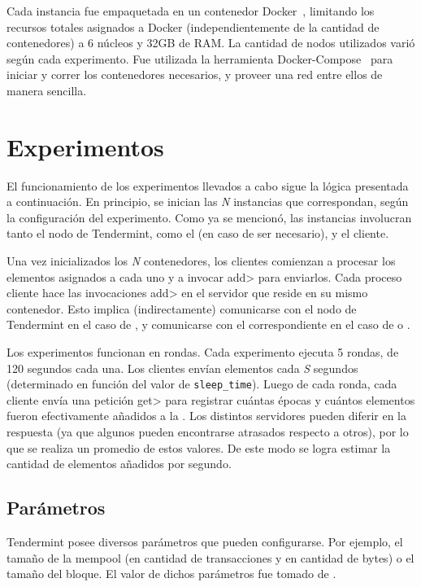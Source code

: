 %
Cada instancia fue empaquetada en un contenedor Docker~\cite{docker},
limitando los recursos totales asignados a Docker (independientemente de la cantidad de contenedores)
a 6 núcleos y 32GB de RAM.
%
La cantidad de nodos utilizados varió según cada experimento.
%
Fue utilizada la herramienta Docker-Compose~\cite{docker-compose} para iniciar y correr los contenedores necesarios,
y proveer una red entre ellos de manera sencilla.


\section{Experimentos}
El funcionamiento de los experimentos llevados a cabo sigue la lógica presentada a continuación.
%
En principio, se inician las \textit{N} instancias que correspondan, según la configuración del experimento.
%
Como ya se mencionó, las instancias involucran tanto el nodo de Tendermint, como el \collector (en caso de
ser necesario), y el cliente.
%

Una vez inicializados los \textit{N} contenedores, los clientes comienzan a procesar los elementos asignados a cada
uno y a invocar \<add> para enviarlos.
%
Cada proceso cliente hace las invocaciones \<add> en el servidor que reside en su mismo contenedor. 
%
Esto implica (indirectamente) comunicarse con el nodo de Tendermint en el caso de \vanilla, y
comunicarse con el \collector correspondiente en el caso de \compresschain o \hashchain.

Los experimentos funcionan en rondas.
%
Cada experimento ejecuta 5 rondas, de 120 segundos cada una.
%
Los clientes envían elementos cada \textit{S} segundos (determinado en función del valor
de \texttt{sleep\_time}).
%
Luego de cada ronda, cada cliente envía una petición \<get> para registrar cuántas épocas y cuántos
elementos fueron efectivamente añadidos a la \setchain.
%
Los distintos servidores pueden diferir en la respuesta (ya que algunos pueden encontrarse atrasados
respecto a otros), por lo que se realiza un promedio de estos valores.
%
De este modo se logra estimar la cantidad de elementos añadidos por segundo.

\subsection{Parámetros}
Tendermint posee diversos parámetros que pueden configurarse.
Por ejemplo, el tamaño de la mempool
(en cantidad de transacciones y en cantidad de bytes) o el tamaño del bloque.
El valor de dichos parámetros fue tomado de \cite{tendermint.design}.

